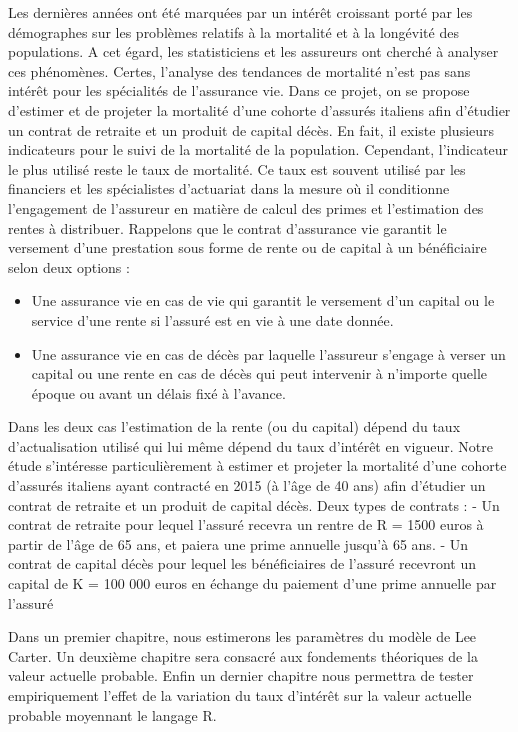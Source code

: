 \documentclass[french]{report}
\begin{document}
Les dernières années ont été marquées par un intérêt croissant porté par les démographes sur les problèmes relatifs à la mortalité et à la longévité des populations. A cet égard, les statisticiens et les assureurs ont cherché à analyser ces phénomènes. Certes, l'analyse des tendances de mortalité n'est pas sans intérêt pour les spécialités de l'assurance vie.
\vskip 0.1in
Dans ce projet, on se propose d’estimer et de projeter la mortalité d’une cohorte d’assurés italiens afin d’étudier un contrat de retraite et un produit de capital décès. En fait, il existe plusieurs indicateurs pour le suivi de la mortalité de la population. Cependant, l'indicateur le plus utilisé reste le taux de mortalité. Ce taux est souvent utilisé par les financiers et les spécialistes d'actuariat dans la mesure où il conditionne l'engagement de l'assureur en matière de calcul des primes et l'estimation des rentes à distribuer. Rappelons que le contrat d’assurance vie garantit  le versement d’une prestation sous forme de rente ou de capital à un bénéficiaire selon deux options :
\vskip 0.1in
\begin{itemize}
    \item  Une assurance vie en cas de vie qui garantit le versement d'un capital ou le service d'une rente si l'assuré est en vie à une date donnée.
\vskip 0.1in
    \item Une assurance vie en cas de décès par laquelle l'assureur s'engage à verser un capital ou une rente en cas de décès qui peut intervenir à n'importe quelle époque ou avant un délais fixé à l'avance.
\end{itemize}

\vskip 0.1in
Dans les deux cas l'estimation de la rente (ou du capital) dépend du taux d'actualisation utilisé qui lui même dépend du taux d'intérêt en vigueur.
\vskip 0.1in
Notre étude s'intéresse particulièrement à estimer et projeter la mortalité d’une cohorte d’assurés italiens ayant contracté en 2015 (à l’âge de 40 ans) afin d’étudier un contrat de retraite et un produit de capital décès.  Deux types de contrats :
 - Un contrat de retraite pour lequel l’assuré recevra un rentre de R = 1500 euros à partir de l’âge de 65 ans, et paiera une prime annuelle jusqu’à 65 ans.
 - Un contrat de capital décès pour lequel les bénéficiaires de l’assuré recevront un capital de K = 100 000 euros
en échange du paiement d’une prime annuelle par l’assuré

\vskip 0.1in
\noindent
Dans un premier chapitre, nous estimerons les paramètres du modèle de Lee Carter.
\vskip 0.1in
\noindent
Un deuxième chapitre sera consacré aux fondements théoriques de la valeur actuelle probable.
\vskip 0.1in
\noindent
Enfin un dernier chapitre nous permettra de tester empiriquement l'effet de la variation du taux d'intérêt sur la valeur actuelle probable moyennant le langage R.
\end{document}
